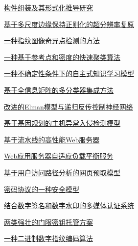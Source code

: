 \documentclass[a4paper]{article}
\begin{document}
\href{http://www.jos.org.cn/ch/reader/download_pdf.aspx?file_no=20030606&year_id=2003&quarter_id=6&falg=1}{构件组装及其形式化推导研究}

\href{http://www.jos.org.cn/ch/reader/download_pdf.aspx?file_no=20030607&year_id=2003&quarter_id=6&falg=1}{基于多尺度边缘保持正则化的超分辨率复原}

\href{http://www.jos.org.cn/ch/reader/download_pdf.aspx?file_no=20030608&year_id=2003&quarter_id=6&falg=1}{一种指纹图像奇异点检测的方法}

\href{http://www.jos.org.cn/ch/reader/download_pdf.aspx?file_no=20030609&year_id=2003&quarter_id=6&falg=1}{一种基于参考点和密度的快速聚类算法}

\href{http://www.jos.org.cn/ch/reader/download_pdf.aspx?file_no=20030610&year_id=2003&quarter_id=6&falg=1}{一种不确定性条件下的自主式知识学习模型}

\href{http://www.jos.org.cn/ch/reader/download_pdf.aspx?file_no=20030611&year_id=2003&quarter_id=6&falg=1}{基于全信息矩阵的多分类器集成方法}

\href{http://www.jos.org.cn/ch/reader/download_pdf.aspx?file_no=20030612&year_id=2003&quarter_id=6&falg=1}{改进的Elman模型与递归反传控制神经网络}

\href{http://www.jos.org.cn/ch/reader/download_pdf.aspx?file_no=20030613&year_id=2003&quarter_id=6&falg=1}{基于基因规划的主机异常入侵检测模型}

\href{http://www.jos.org.cn/ch/reader/download_pdf.aspx?file_no=20030614&year_id=2003&quarter_id=6&falg=1}{基于流水线的高性能Web服务器}

\href{http://www.jos.org.cn/ch/reader/download_pdf.aspx?file_no=20030615&year_id=2003&quarter_id=6&falg=1}{Web应用服务器自适应负载平衡服务}

\href{http://www.jos.org.cn/ch/reader/download_pdf.aspx?file_no=20030616&year_id=2003&quarter_id=6&falg=1}{基于用户访问路径分析的网页预取模型}

\href{http://www.jos.org.cn/ch/reader/download_pdf.aspx?file_no=20030617&year_id=2003&quarter_id=6&falg=1}{密码协议的一种安全模型}

\href{http://www.jos.org.cn/ch/reader/download_pdf.aspx?file_no=20030618&year_id=2003&quarter_id=6&falg=1}{结合数字签名和数字水印的多媒体认证系统}

\href{http://www.jos.org.cn/ch/reader/download_pdf.aspx?file_no=20030619&year_id=2003&quarter_id=6&falg=1}{两类强壮的门限密钥托管方案}

\href{http://www.jos.org.cn/ch/reader/download_pdf.aspx?file_no=20030620&year_id=2003&quarter_id=6&falg=1}{一种二进制数字指纹编码算法}
\end{document}
